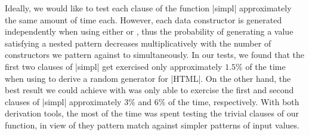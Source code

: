 Ideally, we would like to test each clause of the function |simpl| approximately
the same amount of time each.
%
However, each data constructor is generated independently when using either
\megadeth or \dragen, thus the probability of generating a value satisfying a
nested pattern decreases multiplicatively with the number of constructors we
pattern against to simultaneously.
%
In our tests, we found that the first two clauses of |simpl| get exercised only
approximately $1.5\%$ of the time when using \megadeth to derive a random
generator for |HTML|.
%
On the other hand, the best result we could achieve with \dragen was only able
to exercise the first and second clauses of |simpl| approximately $3\%$ and
$6\%$ of the time, respectively.
%
With both derivation tools, the most of the time was spent testing the trivial
clauses of our function, in view of they pattern match against simpler patterns
of input values.






